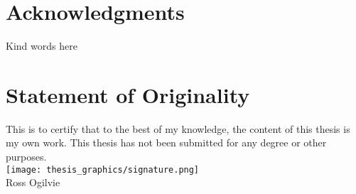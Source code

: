 
\section*{Acknowledgments}

Kind words here \todo{}

\vfill
\section*{Statement of Originality}

This is to certify that to the best of my knowledge, the content of this thesis is my own work. This thesis has not been submitted for any degree or other purposes.
\\
\texttt{[image: thesis\_graphics/signature.png]}
\\
Ross Ogilvie
